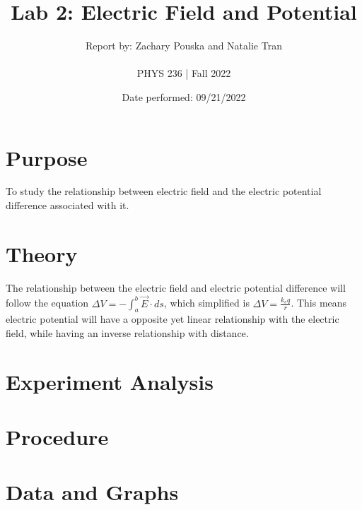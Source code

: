 \documentclass[titlepage]{article}
\begin{document}
\title{\textbf{Lab 2: Electric Field and Potential}}
\author{Report by: Zachary Pouska and  Natalie Tran \\ \\ 
PHYS 236 | Fall 2022}
\date{Date performed: 09/21/2022}

	\maketitle
	\section{Purpose}
	To study the relationship between electric field and the electric potential difference associated with it.
	\section{Theory}	
	The relationship between the electric field and electric potential difference will follow the equation \(\Delta V = -\int_{a}^{b} \vec{E} \cdot ds\), which simplified is \(\Delta V = \frac{k_{e}q}{r}\). This means electric potential will have a opposite yet linear relationship with the electric field, while having an inverse relationship with distance.
	\section{Experiment Analysis}
	\section{Procedure}
	\section{Data and Graphs}
\end{document}
